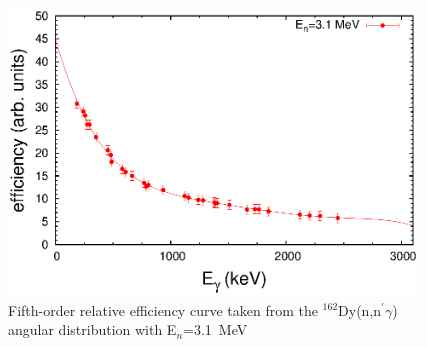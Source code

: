 \begin{figure}[ht]
\begin{center}
\includegraphics[width=0.97\textwidth]{figures/310_polyfit_color.eps}
\caption{Fifth-order relative efficiency curve taken from the $^{162}$Dy(n,n$^{\prime}\gamma$) angular distribution with E$_n$=3.1~MeV
\label{fig:polyfit}}
\end{center}
\end{figure}

